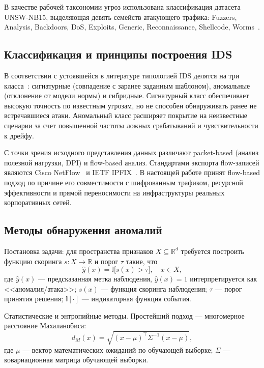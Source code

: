 В качестве рабочей таксономии угроз использована классификация
датасета UNSW-NB15, выделяющая девять семейств атакующего трафика:
Fuzzers, Analysis, Backdoors, DoS, Exploits, Generic, Reconnaissance,
Shellcode, Worms~\cite{moustafa2015unsw}.

\subsection{Классификация и принципы построения IDS}

В соответствии с устоявшейся в литературе типологией IDS делятся на
три класса~\cite{khraisat2019survey, ahmad2021nids, ferrag2020dlcyber}:
сигнатурные (совпадение с заранее заданным шаблоном), аномальные
(отклонение от модели нормы) и гибридные. Сигнатурный класс
обеспечивает высокую точность по известным угрозам, но не способен
обнаруживать ранее не встречавшиеся атаки. Аномальный класс
расширяет покрытие на неизвестные сценарии за счет повышенной
частоты ложных срабатываний и чувствительности к дрейфу.

С точки зрения исходного представления данных различают
packet-based (анализ полезной нагрузки, DPI) и flow-based анализ.
Стандартами экспорта flow-записей являются Cisco
NetFlow~\cite{rfc3954} и IETF IPFIX~\cite{rfc7011}. В настоящей
работе принят flow-based подход по причине его совместимости с
шифрованным трафиком, ресурсной эффективности и прямой
переносимости на инфраструктуры реальных корпоративных сетей.

\subsection{Методы обнаружения аномалий}

Постановка задачи: для пространства признаков
\(X \subseteq \mathbb{R}^d\) требуется построить функцию скоринга
\(s\colon X \to \mathbb{R}\) и порог \(\tau\) такие, что
\begin{equation}
\hat{y}(x) = \mathbb{I}\bigl[s(x) > \tau\bigr],
\quad x \in X,
\label{eq:detector}
\end{equation}
где \(\hat{y}(x)\) --- предсказанная метка наблюдения,
\(\hat{y}(x)=1\) интерпретируется как <<аномалия/атака>>; \(s(x)\) ---
функция скоринга наблюдения; \(\tau\) --- порог принятия решения;
\(\mathbb{I}[\cdot]\) --- индикаторная функция события.

Статистические и энтропийные методы. Простейший подход ---
многомерное расстояние Махаланобиса:
\begin{equation}
d_M(x) = \sqrt{(x-\mu)^{\top}\Sigma^{-1}(x-\mu)},
\label{eq:mahalanobis}
\end{equation}
где \(\mu\) --- вектор математических ожиданий по обучающей
выборке; \(\Sigma\) --- ковариационная матрица обучающей выборки.

